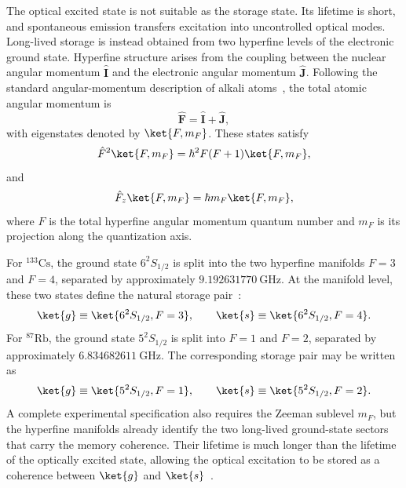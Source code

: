 The optical excited state is not suitable as the storage state. Its lifetime is short, and spontaneous emission transfers excitation into uncontrolled optical modes. Long-lived storage is instead obtained from two hyperfine levels of the electronic ground state. Hyperfine structure arises from the coupling between the nuclear angular momentum \(\hat{\mathbf I}\) and the electronic angular momentum \(\hat{\mathbf J}\). Following the standard angular-momentum description of alkali atoms~\cite{Steck_CsDLine,Steck_Rb87DLine}, the total atomic angular momentum is
\begin{equation}
    \hat{\mathbf F} = \hat{\mathbf I} + \hat{\mathbf J},
    \label{eq:total_angular_momentum}
\end{equation}
with eigenstates denoted by \(\ket{F,m_F}\). These states satisfy
\begin{equation}
    \hat{F}^2\ket{F,m_F}
    =
    \hbar^2 F(F+1)\ket{F,m_F},
    \label{eq:F_squared}
\end{equation}
and
\begin{equation}
    \hat{F}_z\ket{F,m_F}
    =
    \hbar m_F\ket{F,m_F},
    \label{eq:Fz_projection}
\end{equation}
where \(F\) is the total hyperfine angular momentum quantum number and \(m_F\) is its projection along the quantization axis.

For \({}^{133}\mathrm{Cs}\), the ground state \(6^2S_{1/2}\) is split into the two hyperfine manifolds \(F=3\) and \(F=4\), separated by approximately \(\SI{9.192631770}{\giga\hertz}\). At the manifold level, these two states define the natural storage pair~\cite{Steck_CsDLine}:
\begin{equation}
    \ket{g} \equiv \ket{6^2S_{1/2},F=3},
    \qquad
    \ket{s} \equiv \ket{6^2S_{1/2},F=4}.
    \label{eq:cs_memory_states}
\end{equation}
For \({}^{87}\mathrm{Rb}\), the ground state \(5^2S_{1/2}\) is split into \(F=1\) and \(F=2\), separated by approximately \(\SI{6.834682611}{\giga\hertz}\). The corresponding storage pair may be written as~\cite{Steck_Rb87DLine}
\begin{equation}
    \ket{g} \equiv \ket{5^2S_{1/2},F=1},
    \qquad
    \ket{s} \equiv \ket{5^2S_{1/2},F=2}.
    \label{eq:rb_memory_states}
\end{equation}
A complete experimental specification also requires the Zeeman sublevel \(m_F\), but the hyperfine manifolds already identify the two long-lived ground-state sectors that carry the memory coherence. Their lifetime is much longer than the lifetime of the optically excited state, allowing the optical excitation to be stored as a coherence between \(\ket{g}\) and \(\ket{s}\)~\cite{Steck_CsDLine,Steck_Rb87DLine,Apgteitiav_FinkelsteinEtAl_2023}.


